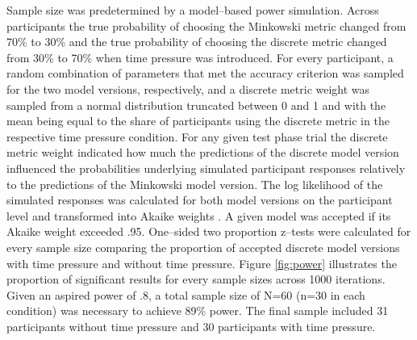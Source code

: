 \documentclass[a4paper,man,natbib]{apa6}
\begin{document}
Sample size was predetermined by a model--based power simulation. Across participants the true probability of choosing the Minkowski metric changed from 70\% to 30\% and the true probability of choosing the discrete metric changed from 30\% to 70\% when time pressure was introduced. For every participant, a random combination of parameters that met the accuracy criterion was sampled for the two model versions, respectively, and a discrete metric weight was sampled from a normal distribution truncated between 0 and 1 and with the mean being equal to the share of participants using the discrete metric in the respective time pressure condition. For any given test phase trial the discrete metric weight indicated how much the predictions of the discrete model version influenced the probabilities underlying simulated participant responses relatively to the predictions of the Minkowski model version. The log likelihood of the simulated responses was calculated for both model versions on the participant level and transformed into Akaike weights \citep{wagenmakers2004aic}. A given model was accepted if its Akaike weight exceeded .95. One--sided two proportion z--tests were calculated for every sample size comparing the proportion of accepted discrete model versions with time pressure and without time pressure. Figure \ref{fig:power} illustrates the proportion of significant results for every sample sizes across 1000 iterations. Given an aspired power of .8, a total sample size of N=60 (n=30 in each condition) was necessary to achieve 89\% power. The final sample included 31 participants without time pressure and 30 participants with time pressure.
\end{document}
